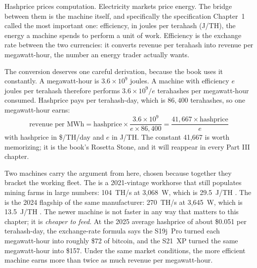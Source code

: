 Hashprice prices computation. Electricity markets price energy. The bridge between them is the machine itself, and specifically the specification Chapter~1 called the most important one: efficiency, in joules per terahash (J/TH), the energy a machine spends to perform a unit of work. Efficiency is the exchange rate between the two currencies: it converts revenue per terahash into revenue per megawatt-hour, the number an energy trader actually wants.

The conversion deserves one careful derivation, because the book uses it constantly. A megawatt-hour is $3.6 \times 10^9$ joules. A machine with efficiency $e$ joules per terahash therefore performs $3.6 \times 10^9 / e$ terahashes per megawatt-hour consumed. Hashprice pays per terahash-day, which is $86{,}400$ terahashes, so one megawatt-hour earns:
\[
\text{revenue per MWh} = \text{hashprice} \times \frac{3.6 \times 10^9}{e \times 86{,}400} = \frac{41{,}667 \times \text{hashprice}}{e}
\]
with hashprice in \$/TH/day and $e$ in J/TH. %
The constant 41,667 is worth memorizing; it is the book's Rosetta Stone, and it will reappear in every Part III chapter.

Two machines carry the argument from here, chosen because together they bracket the working fleet. The  is a 2021-vintage workhorse that still populates mining farms in large numbers: 104~TH/s at 3,068~W, which is 29.5~J/TH \autocite{bitmain2021s19jpro}. %
The  is the 2024 flagship of the same manufacturer: 270~TH/s at 3,645~W, which is 13.5~J/TH \autocite{bitmain2024s21xp}. %
The newer machine is not faster in any way that matters to this chapter; it is \emph{cheaper to feed}. At the 2025 average hashprice of about \$0.051 per terahash-day, the exchange-rate formula says the S19j~Pro turned each megawatt-hour into roughly \$72 of bitcoin, and the S21~XP turned the same megawatt-hour into \$157. %
Under the same market conditions, the more efficient machine earns more than twice as much revenue per megawatt-hour.


